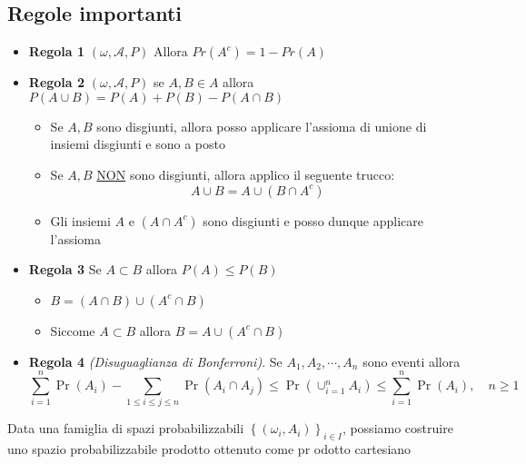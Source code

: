 \subsection{Regole importanti}
\begin{itemize}
	\item  \textbf{Regola 1} $ \left(\omega , \mathcal{A}, P\right) $ Allora $ Pr\left(A^{c}\right) = 1-Pr\left(A\right) $
	\item \textbf{Regola 2} $ \left(\omega , \mathcal{A}, P\right) $ se $ A, B \in A $ allora $ P\left(A \cup B\right) = P\left(A\right) + P\left(B\right) - P\left(A \cap B\right) $
	      \begin{itemize}
		      \item Se $ A, B $ sono disgiunti, allora posso applicare l'assioma di unione di insiemi disgiunti e sono a posto
		      \item Se $ A,B $ \underline{NON} sono disgiunti, allora applico il seguente trucco:
		            \[
			            A \cup B = A \cup\left(B \cap A^{c}\right)
		            \]
		      \item Gli insiemi $ A $ e $ \left(A \cap A^{c}\right) $ sono disgiunti e posso dunque applicare l'assioma
	      \end{itemize}
	\item \textbf{Regola 3} Se $ A \subset B $ allora $ P\left(A\right) \le P\left(B\right) $
	      \begin{itemize}
		      \item $ B = \left(A \cap B\right) \cup \left(A^{c}\cap B\right) $
		      \item Siccome $ A \subset B $ allora $ B= A \cup\left(A^{c}\cap B\right) $
	      \end{itemize}
	\item \textbf{Regola 4} \textit{(Disuguaglianza di Bonferroni)}. Se $A_1, A_2, \cdots, A_n$ sono eventi allora
	      \[
		      \sum_{i=1}^n \Pr\left(A_i\right)-\sum_{1 \leq i \leq j \leq n} \Pr\left(A_i \cap A_j\right) \leq \Pr\left(\cup_{i=1}^n A_i\right) \leq \sum_{i=1}^n \Pr\left(A_i\right), \quad n \geq 1
	      \]
\end{itemize}
\begin{definizione}{}
	Data una famiglia di spazi probabilizzabili $ \left\{\left(\omega _i, A_i\right)\right\}_{i \in  I} $, possiamo costruire uno spazio probabilizzabile prodotto ottenuto come pr odotto cartesiano
\end{definizione}
